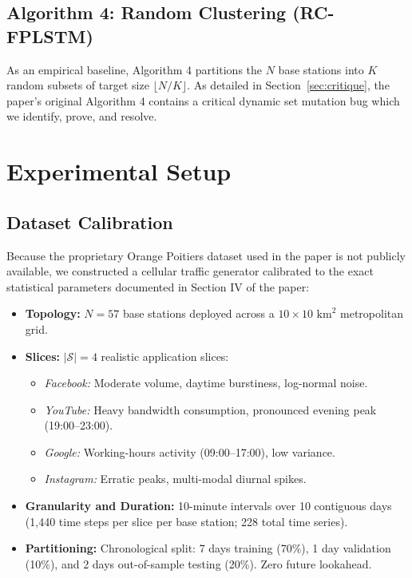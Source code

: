 \documentclass[10pt,journal,compsoc,twocolumn]{article}
\begin{document}
\subsection{Algorithm 4: Random Clustering (RC-FPLSTM)}
As an empirical baseline, Algorithm 4 partitions the $N$ base stations into $K$ random subsets of target size $\lfloor N / K \rfloor$. As detailed in Section~\ref{sec:critique}, the paper's original Algorithm 4 contains a critical dynamic set mutation bug which we identify, prove, and resolve.

\section{Experimental Setup}

\subsection{Dataset Calibration}
Because the proprietary Orange Poitiers dataset used in the paper is not publicly available, we constructed a cellular traffic generator calibrated to the exact statistical parameters documented in Section IV of the paper:
\begin{itemize}
    \item \textbf{Topology:} $N = 57$ base stations deployed across a $10 \times 10\text{ km}^2$ metropolitan grid.
    \item \textbf{Slices:} $|\mathcal{S}| = 4$ realistic application slices:
    \begin{itemize}
        \item \textit{Facebook:} Moderate volume, daytime burstiness, log-normal noise.
        \item \textit{YouTube:} Heavy bandwidth consumption, pronounced evening peak (19:00--23:00).
        \item \textit{Google:} Working-hours activity (09:00--17:00), low variance.
        \item \textit{Instagram:} Erratic peaks, multi-modal diurnal spikes.
    \end{itemize}
    \item \textbf{Granularity and Duration:} 10-minute intervals over 10 contiguous days (1,440 time steps per slice per base station; 228 total time series).
    \item \textbf{Partitioning:} Chronological split: 7 days training (70\%), 1 day validation (10\%), and 2 days out-of-sample testing (20\%). Zero future lookahead.
\end{itemize}
\end{document}
